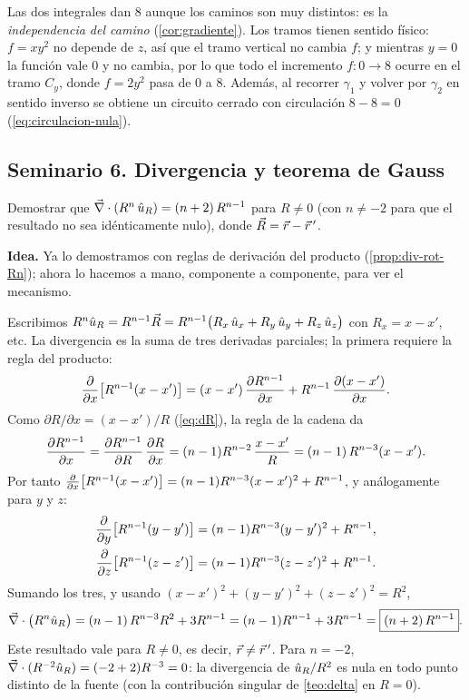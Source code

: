 \begin{observacion}
Las dos integrales dan $8$ aunque los caminos son muy distintos: es la
\emph{independencia del camino} (\cref{cor:gradiente}). Los tramos tienen
sentido físico: $f=xy^{2}$ no depende de $z$, así que el tramo vertical no
cambia $f$; y mientras $y=0$ la función vale $0$ y no cambia, por lo que todo el
incremento $f:0\to8$ ocurre en el tramo $C_y$, donde $f=2y^{2}$ pasa de $0$ a $8$. Además,
al recorrer $\gamma_1$ y volver por $\gamma_2$ en sentido inverso se obtiene un
circuito cerrado con circulación $8-8=0$ (\cref{eq:circulacion-nula}).
\end{observacion}



\subsection{Seminario 6. Divergencia y teorema de Gauss}\label{sem:gauss}
\begin{ejercicio}[Divergencia de $R^{n}\uR$]\label{ejer:div-Rn}
Demostrar que $\vec{\nabla}\cdot(R^{n}\,\hat{u}_{R})=(n+2)\,R^{n-1}$ para $R\neq0$
(con $n\neq-2$ para que el resultado no sea idénticamente nulo), donde
$\vec{R}=\vec{r}-\vec{r}\,'$.
\end{ejercicio}
\begin{resolucion}
\textbf{Idea.} Ya lo demostramos con reglas de derivación del producto
(\cref{prop:div-rot-Rn}); ahora lo hacemos a mano, componente a componente,
para ver el mecanismo.

Escribimos $R^{n}\hat{u}_{R}=R^{n-1}\vec{R}=R^{n-1}\bigl(R_x\,\hat{u}_{x}+R_y\,\hat{u}_{y}+R_z\,\hat{u}_{z}\bigr)$ con
$R_x=x-x'$, etc. La divergencia es la suma de tres derivadas parciales; la primera
requiere la regla del producto:
\[
  \frac{\partial }{\partial x}\bigl[R^{n-1}(x-x')\bigr]=(x-x')\,\frac{\partial R^{n-1}}{\partial x}+R^{n-1}\,\frac{\partial (x-x')}{\partial x} .
\]
Como $\partial R/\partial x=(x-x')/R$ (\cref{eq:dR}), la regla de la cadena da
\[
  \frac{\partial R^{n-1}}{\partial x}=\frac{\partial R^{n-1}}{\partial R}\,\frac{\partial R}{\partial x}=(n-1)R^{n-2}\,\frac{x-x'}{R}
  =(n-1)\,R^{n-3}(x-x') .
\]
Por tanto
$\frac{\partial }{\partial x}\bigl[R^{n-1}(x-x')\bigr]=(n-1)R^{n-3}(x-x')^{2}+R^{n-1}$, y análogamente para
$y$ y $z$:
\begin{align*}
  \frac{\partial }{\partial y}\bigl[R^{n-1}(y-y')\bigr]&=(n-1)R^{n-3}(y-y')^{2}+R^{n-1},\\
  \frac{\partial }{\partial z}\bigl[R^{n-1}(z-z')\bigr]&=(n-1)R^{n-3}(z-z')^{2}+R^{n-1}.
\end{align*}
Sumando los tres, y usando $(x-x')^{2}+(y-y')^{2}+(z-z')^{2}=R^{2}$,
\[
  \vec{\nabla}\cdot\bigl(R^{n}\hat{u}_{R}\bigr)=(n-1)\,R^{n-3}R^{2}+3R^{n-1}=(n-1)R^{n-1}+3R^{n-1}=\boxed{(n+2)\,R^{n-1}} .
\]
Este resultado vale para $R\neq0$, es decir, $\vec{r}\neq\vec{r}\,'$. Para $n=-2$,
$\vec{\nabla}\cdot(R^{-2}\hat{u}_{R})=(-2+2)R^{-3}=0$: la divergencia de $\hat{u}_{R}/R^{2}$ es nula en todo
punto distinto de la fuente (con la contribución singular de \cref{teo:delta}
en $R=0$).
\end{resolucion}

